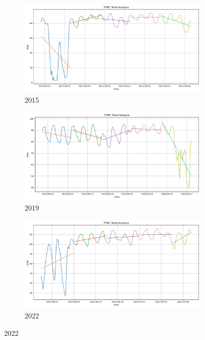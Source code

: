 \begin{figure}[h]
	\centering
	\caption{15-days FFMC polyfit trend}
	\begin{subfigure}{0.3\textwidth}
		\centering
		\includegraphics[width=\textwidth]{graphs/polyfit_trend_analysis/2015_15days_BLOCK3days_ffmc_trend_analysis.png}
		\caption{2015}
		\label{fig:2015_polyfit_ffmc}
	\end{subfigure}
	\hfill
	\begin{subfigure}{0.3\textwidth}
		\centering
		\includegraphics[width=\textwidth]{graphs/polyfit_trend_analysis/2019_15days_BLOCK3days_ffmc_trend_analysis.png}
		\caption{2019}
		\label{fig:2019_polyfit_ffmc}
	\end{subfigure}
	\hfill
	\begin{subfigure}{0.3\textwidth}
		\centering
		\includegraphics[width=\textwidth]{graphs/polyfit_trend_analysis/2022_15days_BLOCK3days_ffmc_trend_analysis.png}
		\caption{2022}
		\label{fig:2022_polyfit_ffmc}
	\end{subfigure}
	
	\label{fig:ffmc_polyfit_15}
\end{figure}

